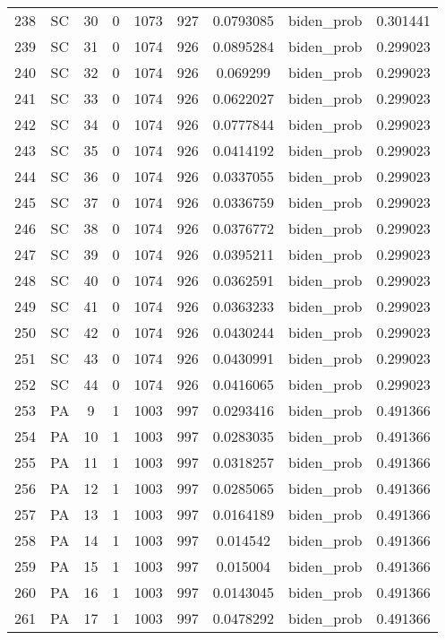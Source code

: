 \documentclass[12pt,a4paper]{article}
\begin{document}
\begin{tabular}{r|cccccccc}
	238 & SC & 30 & 0 & 1073 & 927 & 0.0793085 & biden\_prob & 0.301441 \\
	239 & SC & 31 & 0 & 1074 & 926 & 0.0895284 & biden\_prob & 0.299023 \\
	240 & SC & 32 & 0 & 1074 & 926 & 0.069299 & biden\_prob & 0.299023 \\
	241 & SC & 33 & 0 & 1074 & 926 & 0.0622027 & biden\_prob & 0.299023 \\
	242 & SC & 34 & 0 & 1074 & 926 & 0.0777844 & biden\_prob & 0.299023 \\
	243 & SC & 35 & 0 & 1074 & 926 & 0.0414192 & biden\_prob & 0.299023 \\
	244 & SC & 36 & 0 & 1074 & 926 & 0.0337055 & biden\_prob & 0.299023 \\
	245 & SC & 37 & 0 & 1074 & 926 & 0.0336759 & biden\_prob & 0.299023 \\
	246 & SC & 38 & 0 & 1074 & 926 & 0.0376772 & biden\_prob & 0.299023 \\
	247 & SC & 39 & 0 & 1074 & 926 & 0.0395211 & biden\_prob & 0.299023 \\
	248 & SC & 40 & 0 & 1074 & 926 & 0.0362591 & biden\_prob & 0.299023 \\
	249 & SC & 41 & 0 & 1074 & 926 & 0.0363233 & biden\_prob & 0.299023 \\
	250 & SC & 42 & 0 & 1074 & 926 & 0.0430244 & biden\_prob & 0.299023 \\
	251 & SC & 43 & 0 & 1074 & 926 & 0.0430991 & biden\_prob & 0.299023 \\
	252 & SC & 44 & 0 & 1074 & 926 & 0.0416065 & biden\_prob & 0.299023 \\
	253 & PA & 9 & 1 & 1003 & 997 & 0.0293416 & biden\_prob & 0.491366 \\
	254 & PA & 10 & 1 & 1003 & 997 & 0.0283035 & biden\_prob & 0.491366 \\
	255 & PA & 11 & 1 & 1003 & 997 & 0.0318257 & biden\_prob & 0.491366 \\
	256 & PA & 12 & 1 & 1003 & 997 & 0.0285065 & biden\_prob & 0.491366 \\
	257 & PA & 13 & 1 & 1003 & 997 & 0.0164189 & biden\_prob & 0.491366 \\
	258 & PA & 14 & 1 & 1003 & 997 & 0.014542 & biden\_prob & 0.491366 \\
	259 & PA & 15 & 1 & 1003 & 997 & 0.015004 & biden\_prob & 0.491366 \\
	260 & PA & 16 & 1 & 1003 & 997 & 0.0143045 & biden\_prob & 0.491366 \\
	261 & PA & 17 & 1 & 1003 & 997 & 0.0478292 & biden\_prob & 0.491366 \\

\end{tabular}
\end{document}
